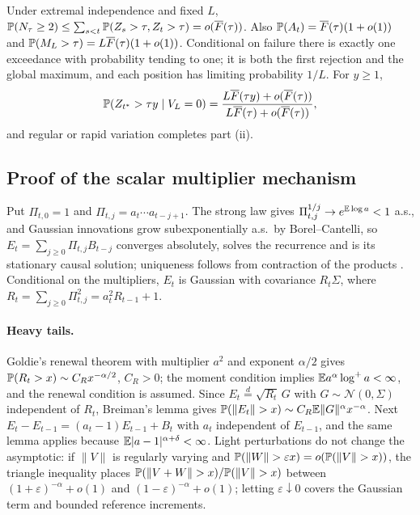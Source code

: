 Under extremal independence and fixed $L$, $\mathbb{P}(N_\tau\ge2)\le\sum_{s<t}\mathbb{P}(Z_s>\tau,Z_t>\tau)=o(\overline{F}(\tau))$. Also $\mathbb{P}(A_t)=\overline{F}(\tau)(1+o(1))$ and $\mathbb{P}(M_L>\tau)=L\overline{F}(\tau)(1+o(1))$. Conditional on failure there is exactly one exceedance with probability tending to one; it is both the first rejection and the global maximum, and each position has limiting probability $1/L$. For $y\ge1$,
\begin{equation}\label{eq:overshootloc}
\mathbb{P}(Z_{t^*}>\tau y\mid V_L=0)=\frac{L\overline{F}(\tau y)+o(\overline{F}(\tau))}{L\overline{F}(\tau)+o(\overline{F}(\tau))},
\end{equation}
and regular or rapid variation completes part (ii).

\subsection{Proof of the scalar multiplier mechanism}\label{app:kesten}

Put $\Pi_{t,0}=1$ and $\Pi_{t,j}=a_t\cdots a_{t-j+1}$. The strong law gives $\Pi_{t,j}^{1/j}\to e^{\mathbb{E}\log a}<1$ a.s., and Gaussian innovations grow subexponentially a.s.\ by Borel--Cantelli, so $E_t=\sum_{j\ge0}\Pi_{t,j}B_{t-j}$ converges absolutely, solves the recurrence and is its stationary causal solution; uniqueness follows from contraction of the products \citep{buraczewski2016}. Conditional on the multipliers, $E_t$ is Gaussian with covariance $R_t\Sigma$, where $R_t=\sum_{j\ge0}\Pi_{t,j}^2=a_t^2R_{t-1}+1$.

\paragraph{Heavy tails.} Goldie's renewal theorem \citep{goldie1991} with multiplier $a^2$ and exponent $\alpha/2$ gives $\mathbb{P}(R_t>x)\sim C_Rx^{-\alpha/2}$, $C_R>0$; the moment condition implies $\mathbb{E} a^\alpha\log^+a<\infty$, and the renewal condition is assumed. Since $E_t\overset{d}{=}\sqrt{R_t}\,G$ with $G\sim\mathcal N(0,\Sigma)$ independent of $R_t$, Breiman's lemma \citep{breiman1965} gives $\PP(\|E_t\|>x)\sim C_R\EE\|G\|^\alpha x^{-\alpha}$. Next $E_t-E_{t-1}=(a_t-1)E_{t-1}+B_t$ with $a_t$ independent of $E_{t-1}$, and the same lemma applies because $\mathbb{E}|a-1|^{\alpha+\delta}<\infty$. Light perturbations do not change the asymptotic: if $\|V\|$ is regularly varying and $\PP(\|W\|>\varepsilon x)=o(\PP(\|V\|>x))$, the triangle inequality places $\PP(\|V+W\|>x)/\PP(\|V\|>x)$ between $(1+\varepsilon)^{-\alpha}+o(1)$ and $(1-\varepsilon)^{-\alpha}+o(1)$; letting $\varepsilon\downarrow0$ covers the Gaussian term and bounded reference increments.

